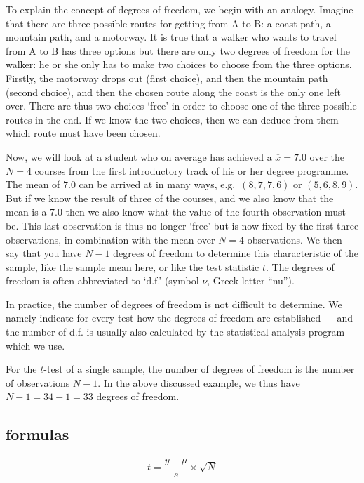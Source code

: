 \documentclass[
]{book}
\begin{document}
To explain the concept of degrees of freedom, we begin with an
analogy. Imagine that there are three possible routes for getting
from A to B: a coast path, a mountain path, and a motorway. It is true that a walker
who wants to travel from A to B has three options but there are only
two degrees of freedom for the walker: he or she only has to make
two choices to choose from the three options. Firstly, the motorway drops out
(first choice), and then the mountain path (second choice),
and then the chosen route along the coast is the only one left over. There are thus two
choices `free' in order to choose one of the three possible routes in the end.
If we know the two choices, then we can deduce from them which
route must have been chosen.

Now, we will look at a student who on average has achieved a \(\overline{x}=7.0\)
over the \(N=4\) courses from the first introductory track of his or her
degree programme. The mean of \(7.0\) can be arrived at in many ways,
e.g.~\((8,7,7,6)\) or \((5,6,8,9)\). But if we know the result of three of the courses,
and we also know that the mean is a 7.0 then we also know what the value
of the fourth observation must be. This last observation is thus no longer
`free' but is now fixed by the first three observations, in combination
with the mean over \(N=4\) observations. We then say that you have \(N-1\)
degrees of freedom to determine this characteristic of the sample, like the sample mean here, or like the test statistic \(t\).
The degrees of freedom is often abbreviated to `d.f.' (symbol \(\nu\), Greek letter ``nu'').

In practice, the number of degrees of freedom is not difficult to determine.
We namely indicate for every test how the degrees of freedom are established
--- and the number of d.f. is usually also calculated by the
statistical analysis program which we use.

For the \(t\)-test of a single sample, the number of degrees of freedom is the
number of observations \(N-1\). In the above discussed example, we thus have
\(N-1 = 34-1 = 33\) degrees of freedom.

\hypertarget{sec:formulas13-1}{%
\subsection{formulas}\label{sec:formulas13-1}}

\begin{equation}
  t = \frac{ \overline{y}-\mu} { s } \times \sqrt{N}
  \label{eq:t-onesample}
\end{equation}
\end{document}
